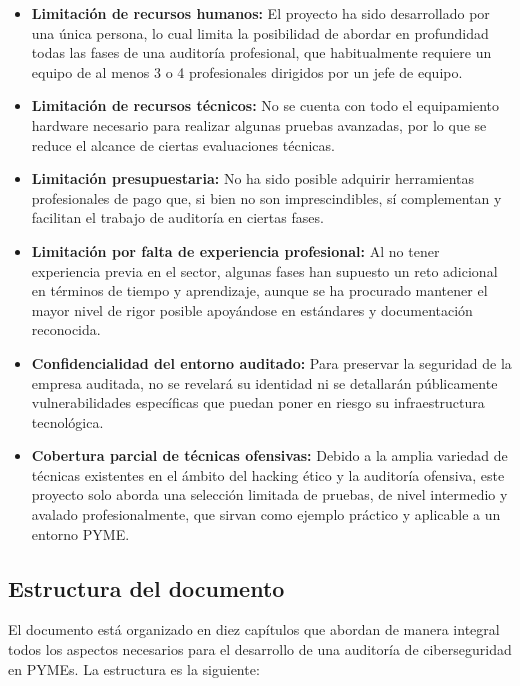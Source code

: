 \documentclass[a4paper, 11pt]{article}
\begin{document}
\begin{itemize}
    \item \textbf{Limitación de recursos humanos:} El proyecto ha sido desarrollado por una única persona, lo cual limita la posibilidad de abordar en profundidad todas las fases de una auditoría profesional, que habitualmente requiere un equipo de al menos 3 o 4 profesionales dirigidos por un jefe de equipo.

    \item \textbf{Limitación de recursos técnicos:} No se cuenta con todo el equipamiento hardware necesario para realizar algunas pruebas avanzadas, por lo que se reduce el alcance de ciertas evaluaciones técnicas.

    \item \textbf{Limitación presupuestaria:} No ha sido posible adquirir herramientas profesionales de pago que, si bien no son imprescindibles, sí complementan y facilitan el trabajo de auditoría en ciertas fases.


    \item \textbf{Limitación por falta de experiencia profesional:} Al no tener experiencia previa en el sector, algunas fases han supuesto un reto adicional en términos de tiempo y aprendizaje, aunque se ha procurado mantener el mayor nivel de rigor posible apoyándose en estándares y documentación reconocida.

    \item \textbf{Confidencialidad del entorno auditado:} Para preservar la seguridad de la empresa auditada, no se revelará su identidad ni se detallarán públicamente vulnerabilidades específicas que puedan poner en riesgo su infraestructura tecnológica.

    \item \textbf{Cobertura parcial de técnicas ofensivas:} Debido a la amplia variedad de técnicas existentes en el ámbito del hacking ético y la auditoría ofensiva, este proyecto solo aborda una selección limitada de pruebas, de nivel intermedio y avalado profesionalmente, que sirvan como ejemplo práctico y aplicable a un entorno PYME.
\end{itemize}




\subsection{Estructura del documento}


El documento está organizado en diez capítulos que abordan de manera integral todos los aspectos necesarios para el desarrollo de una auditoría de ciberseguridad en PYMEs. La estructura es la siguiente:
\end{document}
